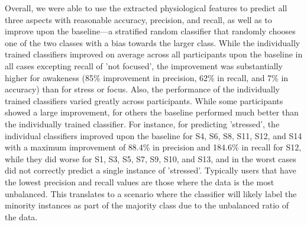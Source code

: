 Overall, we were able to use the extracted physiological features to predict all three aspects with reasonable accuracy, precision, and recall, as well as to improve upon the baseline---a stratified random classifier that randomly chooses one of the two classes with a bias towards the larger class. While the individually trained classifiers improved on average across all participants upon the baseline in all cases excepting recall of 'not focused', the improvement was substantially higher for awakeness (85\% improvement in precision,  62\% in recall, and 7\% in accuracy) than for stress or focus. Also, the performance of the individually trained classifiers varied greatly across participants. While some participants showed a large improvement, for others the baseline performed much better than the individually trained classifier. For instance, for predicting 'stressed', the individual classifiers improved upon the baseline for S4, S6, S8, S11, S12, and S14 with a maximum improvement of 88.4\% in precision and 184.6\% in recall for S12, while they did worse for S1, S3, S5, S7, S9, S10, and S13, and in the worst cases did not correctly predict a single instance of 'stressed'. Typically users that have the lowest precision and recall values are those where the data is the most unbalanced. This translates to a scenario where the classifier will likely label the minority instances as part of the majority class due to the unbalanced ratio of the data.\\[-0.1cm]
%
